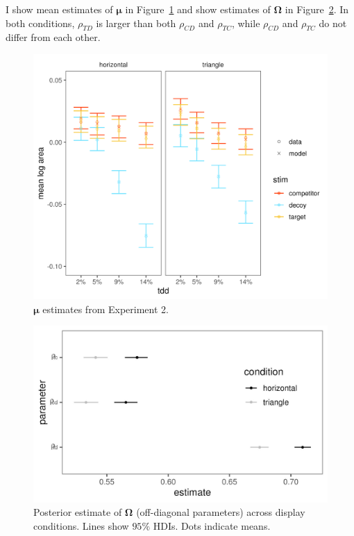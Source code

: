 I show mean estimates of $\boldsymbol{\mu}$ in Figure~\ref{fig:e2mu} and show estimates of $\boldsymbol{\Omega}$ in Figure~\ref{fig:omega}. In both conditions, $\rho_{TD}$ is larger than both $\rho_{CD}$ and $\rho_{TC}$, while $\rho_{CD}$ and $\rho_{TC}$ do not differ from each other. 

\begin{figure}
   \includegraphics[width=\textwidth]{figures/bayes_circle_area_mu_sigma_constant_comp_effect_model_v_data_collapsed.jpeg}
   \caption{$\boldsymbol{\mu}$ estimates from Experiment 2.}
   \label{fig:e2mu}
\end{figure}

\begin{figure}
   \includegraphics[width=\textwidth]{figures/bayes_circle_area_sigma_constant_comp_effect_omega_plot.jpeg}
   \caption{Posterior estimate of $\boldsymbol{\Omega}$ (off-diagonal parameters) across display conditions. Lines show $95\%$ HDIs.  Dots indicate means.}
   \label{fig:omega}
\end{figure}


